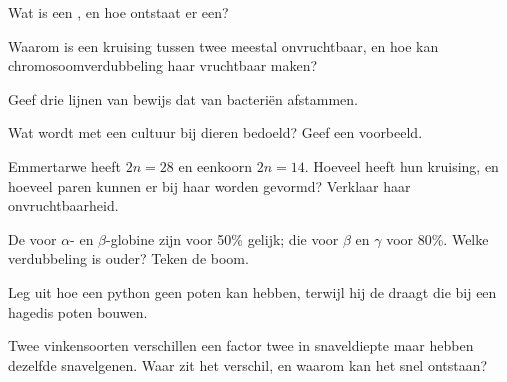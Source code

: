 \begin{exercise}[$\star$]\label{exo:g12:diversification-of-life:2}
Wat is een , en hoe ontstaat er een?
\end{exercise}

\begin{exercise}[$\star$]\label{exo:g12:diversification-of-life:3}
Waarom is een kruising tussen twee  meestal onvruchtbaar, en hoe
kan chromosoomverdubbeling haar vruchtbaar maken?
\end{exercise}

\begin{exercise}[$\star$]\label{exo:g12:diversification-of-life:4}
Geef drie lijnen van bewijs dat  van bacteriën afstammen.
\end{exercise}

\begin{exercise}[$\star$]\label{exo:g12:diversification-of-life:5}
Wat wordt met een cultuur bij dieren bedoeld? Geef een voorbeeld.
\end{exercise}

\begin{exercise}[$\star\star$]\label{exo:g12:diversification-of-life:6}
Emmertarwe heeft $2n = 28$ en eenkoorn $2n = 14$. Hoeveel 
heeft hun kruising, en hoeveel paren kunnen er bij haar  worden
gevormd? Verklaar haar onvruchtbaarheid.
\end{exercise}

\begin{exercise}[$\star\star$]\label{exo:g12:diversification-of-life:7}
De  voor $\alpha$- en $\beta$-globine zijn voor 50\% gelijk; die voor
$\beta$ en $\gamma$ voor 80\%. Welke verdubbeling is ouder? Teken de boom.
\end{exercise}

\begin{exercise}[$\star\star$]\label{exo:g12:diversification-of-life:8}
Leg uit hoe een python geen poten kan hebben, terwijl hij de  draagt
die bij een hagedis poten bouwen.
\end{exercise}

\begin{exercise}[$\star\star$]\label{exo:g12:diversification-of-life:9}
Twee vinkensoorten verschillen een factor twee in snaveldiepte maar hebben
dezelfde snavelgenen. Waar zit het verschil, en waarom kan het snel
ontstaan?
\end{exercise}

